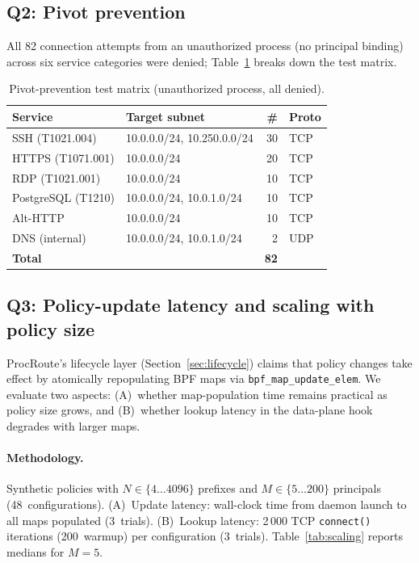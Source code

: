 \documentclass[sigconf]{acmart}
\begin{document}
\subsection{Q2: Pivot prevention}
\label{sec:appendix:q2}

All 82 connection attempts from an unauthorized process (no
principal binding) across six service categories were denied;
Table~\ref{tab:pivot} breaks down the test matrix.

\begin{table}[t]
\centering
\caption{Pivot-prevention test matrix (unauthorized process, all denied).}
\label{tab:pivot}
\small
\begin{tabular}{lp{2.6cm}rl}
\toprule
Service & Target subnet & \# & Proto \\
\midrule
SSH (T1021.004)   & 10.0.0.0/24, 10.250.0.0/24 & 30 & TCP \\
HTTPS (T1071.001) & 10.0.0.0/24             & 20 & TCP \\
RDP (T1021.001)   & 10.0.0.0/24             & 10 & TCP \\
PostgreSQL (T1210)& 10.0.0.0/24, 10.0.1.0/24 & 10 & TCP \\
Alt-HTTP          & 10.0.0.0/24             & 10 & TCP \\
DNS (internal)    & 10.0.0.0/24, 10.0.1.0/24 &  2 & UDP \\
\midrule
\textbf{Total}    &                        & \textbf{82} & \\
\bottomrule
\end{tabular}
\end{table}

\subsection{Q3: Policy-update latency and scaling with policy size}
\label{sec:appendix:q3}

ProcRoute's lifecycle layer
(Section~\ref{sec:lifecycle}) claims that policy changes
take effect by atomically repopulating BPF maps via
\texttt{bpf\_map\_\allowbreak update\_elem}.
We evaluate two aspects: (A)~whether map-population
time remains practical as policy size grows, and
(B)~whether lookup latency in the data-plane hook
degrades with larger maps.

\paragraph{Methodology.}
Synthetic policies with $N \in \{4\ldots4096\}$ prefixes and
$M \in \{5\ldots200\}$ principals (48~configurations).
(A)~Update latency: wall-clock time from daemon launch to all maps
populated (3~trials).
(B)~Lookup latency: 2\,000 TCP \texttt{connect()} iterations
(200~warmup) per configuration (3~trials).
Table~\ref{tab:scaling} reports medians for $M = 5$.
\end{document}
